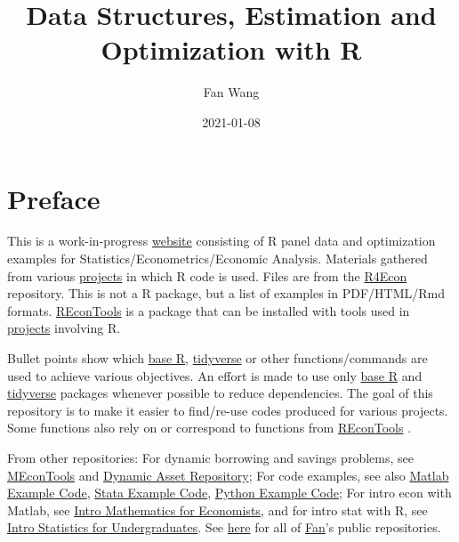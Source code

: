 \documentclass[
]{book}
\title{Data Structures, Estimation and Optimization with R}
\author{Fan Wang}
\date{2021-01-08}
\begin{document}
\maketitle

{
\hypersetup{linkcolor=}
\setcounter{tocdepth}{1}
\tableofcontents
}
\hypertarget{preface}{%
\chapter*{Preface}\label{preface}}

This is a work-in-progress \href{https://fanwangecon.github.io/R4Econ/}{website} consisting of R panel data and optimization examples for Statistics/Econometrics/Economic Analysis. Materials gathered from various \href{https://fanwangecon.github.io/research}{projects} in which R code is used. Files are from the \href{https://github.com/FanWangEcon/R4Econ}{R4Econ} repository. This is not a R package, but a list of examples in PDF/HTML/Rmd formats. \href{https://fanwangecon.github.io/REconTools/}{REconTools} is a package that can be installed with tools used in \href{https://fanwangecon.github.io/research}{projects} involving R.

Bullet points show which \href{https://www.rdocumentation.org/packages/base/versions/3.5.2}{base R}, \href{https://www.tidyverse.org/}{tidyverse} or other functions/commands are used to achieve various objectives. An effort is made to use only \href{https://www.rdocumentation.org/packages/base/versions/3.5.2}{base R} \citep{R-base} and \href{https://www.tidyverse.org/}{tidyverse} \citep{R-tidyverse} packages whenever possible to reduce dependencies. The goal of this repository is to make it easier to find/re-use codes produced for various projects. Some functions also rely on or correspond to functions from \href{https://fanwangecon.github.io/REconTools/}{REconTools} \citep{R-REconTools}.

From other repositories: For dynamic borrowing and savings problems, see \href{https://fanwangecon.github.io/MEconTools/}{MEconTools} and \href{https://fanwangecon.github.io/CodeDynaAsset/}{Dynamic Asset Repository}; For code examples, see also \href{https://fanwangecon.github.io/M4Econ/}{Matlab Example Code}, \href{https://fanwangecon.github.io/Stata4Econ/}{Stata Example Code}, \href{https://fanwangecon.github.io/pyfan/}{Python Example Code}; For intro econ with Matlab, see \href{https://fanwangecon.github.io/Math4Econ/}{Intro Mathematics for Economists}, and for intro stat with R, see \href{https://fanwangecon.github.io/Stat4Econ/}{Intro Statistics for Undergraduates}. See \href{https://github.com/FanWangEcon}{here} for all of \href{https://fanwangecon.github.io/}{Fan}'s public repositories.
\end{document}
